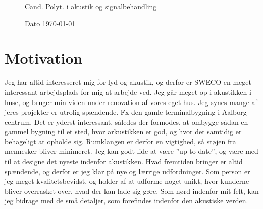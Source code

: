 \documentclass{my_application}
\begin{document}
%
%
\begin{figure}[!ht]
\begin{minipage}[t][1 pt]{.69\textwidth}%
	\Large{Cand. Polyt. i akustik og signalbehandling}
\end{minipage}
\hfill%
\begin{minipage}[t][1 pt][b]{.29\textwidth}
	\vfill
	\hfill Dato \today
\end{minipage}%
\end{figure}
%
\section{Motivation}

Jeg har altid interesseret mig for lyd og akustik, og derfor er SWECO en meget interessant arbejdsplads for mig at arbejde ved. Jeg går meget op i akustikken i huse, og bruger min viden under renovation af vores eget hus. Jeg synes mange af jeres projekter er utrolig spændende. Fx den gamle terminalbygning i Aalborg centrum. Det er yderst interessant, således der formodes, at ombygge sådan en gammel bygning til et sted, hvor arkustikken er god, og hvor det samtidig er behageligt at opholde sig. Rumklangen er derfor en vigtighed, så støjen fra mennesker bliver minimeret. Jeg kan godt lide at være ''up-to-date'', og være med til at designe det nyeste indenfor akustikken. Hvad fremtiden bringer er altid spændende, og derfor er jeg klar på nye og lærrige udfordninger. Som person er jeg meget kvalitetsbevidst, og holder af at udforme noget unikt, hvor kunderne bliver overrasket over, hvad der kan lade sig gøre. Som nørd indenfor mit felt, kan jeg bidrage med de små detaljer, som forefindes indenfor den akustiske verden.


\end{document}
